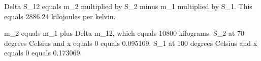 Delta S_12 equals m_2 multiplied by S_2 minus m_1 multiplied by S_1.  
This equals 2886.24 kilojoules per kelvin.  

m_2 equals m_1 plus Delta m_12, which equals 10800 kilograms.  
S_2 at 70 degrees Celsius and x equals 0 equals 0.095109.  
S_1 at 100 degrees Celsius and x equals 0 equals 0.173069.